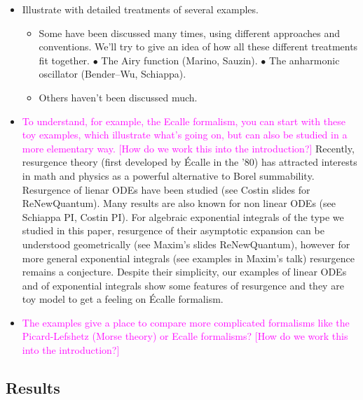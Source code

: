 \documentclass{article}
\begin{document}
\begin{itemize}
\item Illustrate with detailed treatments of several examples.
\begin{itemize}
\item Some have been discussed many times, using different approaches and conventions. We'll try to give an idea of how all these different treatments fit together. $\bullet$ The Airy function (Marino, Sauzin). $\bullet$ The anharmonic oscillator (Bender--Wu, Schiappa).
\item Others haven't been discussed much.
\end{itemize}
\item \textcolor{magenta}{To understand, for example, the Ecalle formalism, you can start with these toy examples, which illustrate what's going on, but can also be studied in a more elementary way. [How do we work this into the introduction?]} Recently, resurgence theory (first developed by \'Ecalle in the '80) has attracted interests in math and physics as a powerful alternative to Borel summability. Resurgence of lienar ODEs have been studied (see Costin slides for ReNewQuantum). Many results are also known for non linear ODEs (see Schiappa PI, Costin PI). For algebraic exponential integrals of the type we studied in this paper, resurgence of their asymptotic expansion can be understood geometrically (see Maxim's slides ReNewQuantum), however for more general exponential integrals (see examples in Maxim's talk) resurgence remains a conjecture. Despite their simplicity, our examples of linear ODEs and of exponential integrals show some features of resurgence and they are toy model to get a feeling on \'Ecalle formalism.       
\item \textcolor{magenta}{The examples give a place to compare more complicated formalisms like the Picard-Lefshetz (Morse theory) or Ecalle formalisms? [How do we work this into the introduction?]}
\end{itemize}
\subsection{Results}
\end{document}
